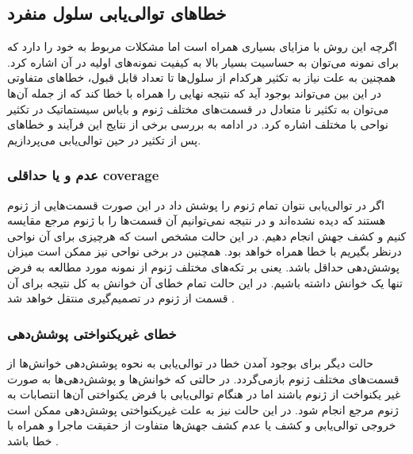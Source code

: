 \subsection{خطاهای توالی‌یابی سلول منفرد}
اگرچه این روش با مزایای بسیاری همراه است اما مشکلات مربوط به خود را دارد که برای نمونه می‌توان به حساسیت بسیار بالا به کیفیت نمونه‌های اولیه در آن اشاره کرد. همچنین به علت نیاز به تکثیر هرکدام از سلول‌ها تا تعداد قابل قبول، خطاهای متفاوتی در این بین می‌تواند بوجود آید که نتیجه نهایی را همراه با خطا کند که از جمله‌ آن‌ها می‌توان به تکثیر نا متعادل در قسمت‌های مختلف ژنوم و بایاس سیستماتیک در تکثیر نواحی با  مختلف اشاره کرد. در ادامه به بررسی برخی از نتایج این فرآیند و خطاهای پس از تکثیر در حین توالی‌یابی می‌پردازیم.

\subsubsection{عدم و یا حداقلی \gls{coverage}}
اگر در توالی‌یابی نتوان تمام ژنوم را پوشش داد در این صورت قسمت‌هایی از ژنوم هستند که دیده نشده‌اند و در نتیجه نمی‌توانیم آن قسمت‌ها را با ژنوم مرجع مقایسه کنیم و کشف جهش انجام دهیم. در این حالت مشخص است که هرچیزی برای آن نواحی درنظر بگیریم با خطا همراه خواهد بود. همچنین در برخی نواحی نیز ممکن است میزان پوشش‌دهی حداقل باشد. یعنی بر تکه‌های مختلف ژنوم از نمونه مورد مطالعه به فرض تنها یک خوانش داشته باشیم. در این حالت تمام خطای آن خوانش به کل نتیجه برای آن قسمت از ژنوم در تصمیم‌گیری منتقل خواهد شد \cite{chan2017gene}.

\subsubsection{خطای غیریکنواختی پوشش‌دهی}
حالت دیگر برای بوجود آمدن خطا در توالی‌یابی به نحوه پوشش‌دهی خوانش‌ها از قسمت‌های مختلف ژنوم بازمی‌گردد. در حالتی که خوانش‌ها و پوشش‌دهی‌ها به صورت غیر یکنواخت از ژنوم باشند اما در هنگام توالی‌یابی با فرض یکنواختی آن‌ها انتصابات به ژنوم مرجع انجام شود. در این حالت نیز به علت غیریکنواختی پوشش‌دهی ممکن است خروجی توالی‌یابی و کشف یا عدم کشف جهش‌ها متفاوت از حقیقت ماجرا و همراه با خطا باشد \cite{garvin2015interactive, lemey2009phylogenetic}.

